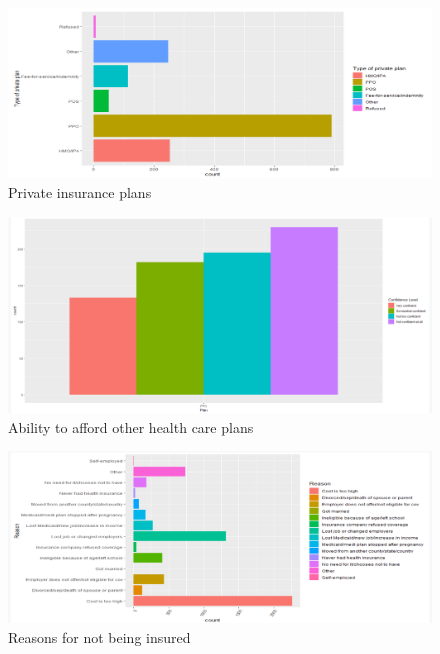 \documentclass[12pt]{article}
\begin{document}
\begin{figure}[H]
\centering
\includegraphics[scale=0.5]{ppo.png}
\caption{Private insurance plans}
\label{fig:ppo}
\end{figure}

\begin{figure}[H]
\centering
\includegraphics[scale=0.5]{notconfident.png}
\caption{Ability to afford other health care plans}
\label{fig:notconfident}
\end{figure}

\begin{figure}[H]
\centering
\includegraphics[scale=0.5]{reasonNotinsured.png}
\caption{Reasons for not being insured}
\label{fig:notinsured}
\end{figure}
\end{document}
